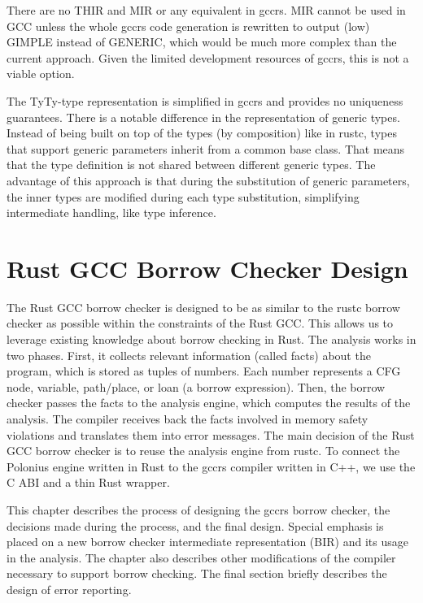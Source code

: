 \documentclass[
  11pt,
  twoside,symmetric]{report}
\begin{document}
There are no THIR and MIR or any equivalent in gccrs. MIR cannot be used
in GCC unless the whole gccrs code generation is rewritten to output
(low) GIMPLE instead of GENERIC, which would be much more complex than
the current approach. Given the limited development resources of gccrs,
this is not a viable option.

The TyTy-type representation is simplified in gccrs and provides no
uniqueness guarantees. There is a notable difference in the
representation of generic types. Instead of being built on top of the
types (by composition) like in rustc, types that support generic
parameters inherit from a common base class. That means that the type
definition is not shared between different generic types. The advantage
of this approach is that during the substitution of generic parameters,
the inner types are modified during each type substitution, simplifying
intermediate handling, like type inference.

\chapter{Rust GCC Borrow Checker
Design}\label{rust-gcc-borrow-checker-design}

The Rust GCC borrow checker is designed to be as similar to the rustc
borrow checker as possible within the constraints of the Rust GCC. This
allows us to leverage existing knowledge about borrow checking in Rust.
The analysis works in two phases. First, it collects relevant
information (called facts) about the program, which is stored as tuples
of numbers. Each number represents a CFG node, variable, path/place, or
loan (a borrow expression). Then, the borrow checker passes the facts to
the analysis engine, which computes the results of the analysis. The
compiler receives back the facts involved in memory safety violations
and translates them into error messages. The main decision of the Rust
GCC borrow checker is to reuse the analysis engine from rustc. To
connect the Polonius engine written in Rust to the gccrs compiler
written in C++, we use the C ABI and a thin Rust wrapper.

This chapter describes the process of designing the gccrs borrow
checker, the decisions made during the process, and the final design.
Special emphasis is placed on a new borrow checker intermediate
representation (BIR) and its usage in the analysis. The chapter also
describes other modifications of the compiler necessary to support
borrow checking. The final section briefly describes the design of error
reporting.
\end{document}
